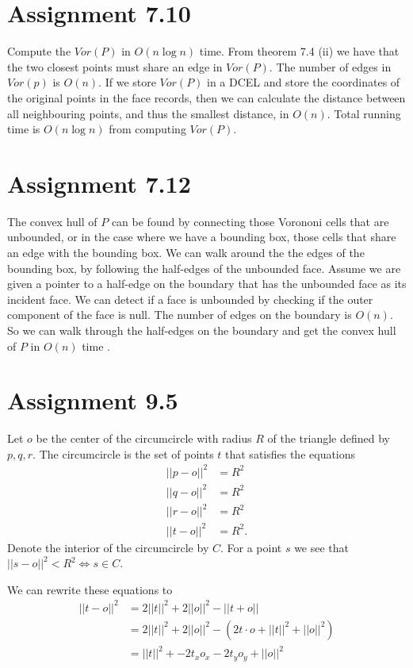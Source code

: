 \documentclass[10pt,a4paper,final,oneside,openany,article,oldfontcommands]{memoir}
\begin{document}
\chapter*{Assignment 7.10}
Compute the $Vor(P)$ in $O(n \log n)$ time. From theorem 7.4 (ii) we have that the two closest points must share an edge in $Vor(P)$. The number of edges in $Vor(p)$ is $O(n)$. If we store $Vor(P)$ in a DCEL and store the coordinates of the original points in the face records, then we can calculate the distance between all neighbouring points, and thus the smallest distance, in $O(n)$. Total running time is $O(n \log n)$ from computing $Vor(P)$.


\chapter*{Assignment 7.12}
The convex hull of $P$ can be found by connecting those Vorononi cells that are unbounded, or in the case where we have a bounding box, those cells that share an edge with the bounding box. We can walk around the the edges of the bounding box, by following the half-edges of the unbounded face. Assume we are given a pointer to a half-edge on the boundary that has the unbounded face as its incident face. We can detect if a face is unbounded by checking if the outer component of the face is null. The number of edges on the boundary is $O(n)$. So we can walk through the half-edges on the boundary and get the convex hull of $P$ in $O(n)$ time .



\chapter*{Assignment 9.5}
Let $o$ be the center of the circumcircle with radius $R$ of the triangle defined by $p, q, r$. The circumcircle is the set of points $t$ that satisfies the equations
\begin{align*}
  ||p - o||^2 &= R^2\\
  ||q - o||^2 &= R^2\\
  ||r - o||^2 &= R^2\\
  ||t - o||^2 &= R^2.
\end{align*}
Denote the interior of the circumcircle by $C$. For a point $s$ we see that $||s - o||^2 < R^2 \iff s \in C$.

We can rewrite these equations to
\begin{align*}
  ||t - o||^2 &= 2||t||^2 + 2||o||^2 - ||t + o||\\
  &= 2||t||^2 + 2||o||^2 - (2 t \cdot o + ||t||^2 + ||o||^2)\\
  &= ||t||^2 +  -2t_xo_x - 2t_yo_y  + ||o||^2
\end{align*}
\end{document}
